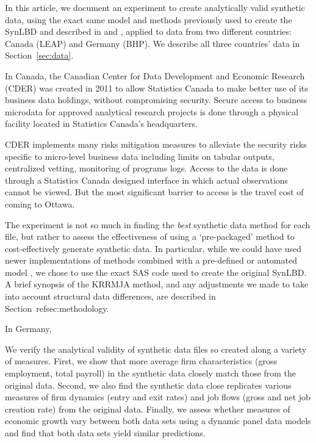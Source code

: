 In this article, we document an experiment to create analytically valid synthetic data, using the exact same model and methods previously used to create the \ac{SynLBD} and described in  \citet[henceforth KRRMJA]{KinneyEtAl2011} and \citet{RePEc:cen:tnotes:11-01}, applied to data from two different countries: Canada (\ac{LEAP}) and Germany (\ac{BHP}). We describe all three countries' data in Section~\ref{sec:data}. 


In Canada, the Canadian Center for Data Development and Economic Research (CDER) was created in 2011 to allow Statistics Canada to make better use of its business data holdings, without compromising security. Secure access  to business microdata for approved analytical research projects is done through a physical facility located in Statistics Canada’s headquarters. 

CDER implements many risks mitigation measures to alleviate the security risks specific to micro-level business data including limits on tabular outputs, centralized vetting, monitoring of programs logs. Access to the data is done through a Statistics Canada designed interface in which actual observations cannot be viewed. But the most significant barrier to access is the travel cost of coming to Ottawa.

The experiment is not so much in finding the \textit{best} synthetic data method for each file, but rather to assess the effectiveness of using a `pre-packaged' method to cost-effectively generate synthetic data. In particular, while we could have used newer implementations of methods combined with a pre-defined or automated model \citep{JSSv074i11,Raab_Nowok_Dibben_2018}, we chose to use the exact SAS code used to create the original \ac{SynLBD}. A brief synopsis of the KRRMJA method, and any adjustments we made to take into account structural data differences, are described in Section~ref{sec:methodology}.



In Germany, 


We verify the analytical validity of synthetic data files so created along a variety of measures. First, we show that more average firm characteristics (gross employment, total payroll) in the synthetic data closely match those from the original data. Second, we also find the synthetic data close replicates various measures of firm dynamics (entry and exit rates) and job flows (gross and net job creation rate) from the original data. Finally, we assess whether measures of economic growth vary between both data sets using a dynamic panel data models and find that both data sets yield similar predictions.


